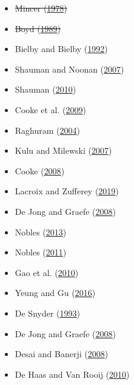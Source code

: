 \documentclass[
]{article}
\providecommand{\tightlist}{%
  \setlength{\itemsep}{0pt}\setlength{\parskip}{0pt}}
\begin{document}
\begin{itemize}
\tightlist
\item
  \sout{Mincer (\protect\hyperlink{ref-mincer1978family}{1978})}
\item
  \sout{Boyd (\protect\hyperlink{ref-boyd1989family}{1989})}
\item
  Bielby and Bielby (\protect\hyperlink{ref-bielby1992will}{1992})
\item
  Shauman and Noonan (\protect\hyperlink{ref-shauman2007family}{2007})
\item
  Shauman (\protect\hyperlink{ref-shauman2010gender}{2010})
\item
  Cooke et al. (\protect\hyperlink{ref-cooke2009longitudinal}{2009})
\item
  Raghuram (\protect\hyperlink{ref-raghuram2004difference}{2004})
\item
  Kulu and Milewski (\protect\hyperlink{ref-kulu2007family}{2007})
\item
  Cooke (\protect\hyperlink{ref-cooke2008migration}{2008})\\
\item
  Lacroix and Zufferey (\protect\hyperlink{ref-lacroix2019life}{2019})\\
\item
  De Jong and Graefe (\protect\hyperlink{ref-de2008family}{2008})\\
\item
  Nobles (\protect\hyperlink{ref-nobles2013migration}{2013})\\
\item
  Nobles (\protect\hyperlink{ref-nobles2011parenting}{2011})\\
\item
  Gao et al. (\protect\hyperlink{ref-gao2010impact}{2010})\\
\item
  Yeung and Gu (\protect\hyperlink{ref-yeung2016left}{2016})\\
\item
  De Snyder (\protect\hyperlink{ref-de1993family}{1993})\\
\item
  De Jong and Graefe (\protect\hyperlink{ref-de2008family}{2008})\\
\item
  Desai and Banerji
  (\protect\hyperlink{ref-desai2008negotiated}{2008})\\
\item
  De Haas and Van Rooij (\protect\hyperlink{ref-de2010migration}{2010})
\end{itemize}
\end{document}

